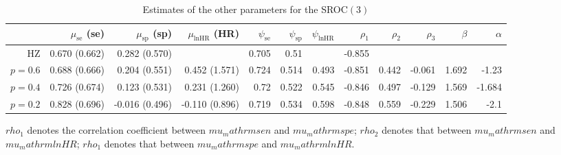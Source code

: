 \begin{table}[!htb]

\caption{\label{tab:sroc-ki67-3}Estimates of the other parameters for the SROC$(3)$}
\centering
\begin{threeparttable}
\begin{tabular}[t]{rrrrrrrrrrrr}
\toprule
 & $\mu_\mathrm{se}$ (se) & $\mu_\mathrm{sp}$ (sp) & $\mu_\mathrm{lnHR}$ (HR) & $\psi_\mathrm{se}$ & $\psi_\mathrm{sp}$ & $\psi_\mathrm{lnHR}$ & $\rho_1$ & $\rho_2$ & $\rho_3$ & $\beta$ & $\alpha$\\
\midrule
HZ & 0.670 (0.662) & 0.282 (0.570) &  & 0.705 & 0.51 &  & -0.855 &  &  &  & \\
$p=0.6$ & 0.688 (0.666) & 0.204 (0.551) & 0.452 (1.571) & 0.724 & 0.514 & 0.493 & -0.851 & 0.442 & -0.061 & 1.692 & -1.23\\
$p=0.4$ & 0.726 (0.674) & 0.123 (0.531) & 0.231 (1.260) & 0.72 & 0.522 & 0.545 & -0.846 & 0.497 & -0.129 & 1.569 & -1.684\\
$p=0.2$ & 0.828 (0.696) & -0.016 (0.496) & -0.110 (0.896) & 0.719 & 0.534 & 0.598 & -0.848 & 0.559 & -0.229 & 1.506 & -2.1\\
\bottomrule
\end{tabular}
\begin{tablenotes}
\item 
			$rho_1$ denotes the correlation coefficient between $mu_mathrm{sen}$ and $mu_mathrm{spe}$;
			$rho_2$ denotes that between $mu_mathrm{sen}$ and $mu_mathrm{lnHR}$;
			$rho_1$ denotes that between $mu_mathrm{spe}$ and $mu_mathrm{lnHR}$.
\end{tablenotes}
\end{threeparttable}
\end{table}
